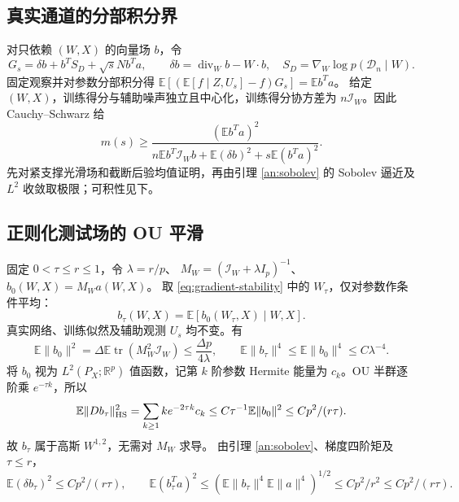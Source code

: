 \documentclass[a4paper]{tufte-handout}
\newcommand{\E}{\mathbb E}
\DeclareMathOperator{\tr}{tr}
\begin{document}
\begin{fullwidth}
\subsection{真实通道的分部积分界}
对只依赖 $(W,X)$ 的向量场 $b$，令
\[
 G_s=\delta b+b^TS_D+\sqrt sN b^Ta,\qquad
 \delta b=\operatorname{div}_Wb-W\cdot b,\quad
 S_D=\nabla_W\log p(\mathcal D_n\mid W).
\]
固定观察并对参数分部积分得
$\E[(\E[f\mid Z,U_s]-f)G_s]=\E b^Ta$。
给定 $(W,X)$，训练得分与辅助噪声独立且中心化，训练得分协方差为
$n\mathcal I_W$。因此 Cauchy--Schwarz 给
\begin{equation}\label{eq:vt-mmse}
 m(s)\ge\frac{(\E b^Ta)^2}
 {n\E b^T\mathcal I_Wb+\E(\delta b)^2+s\E(b^Ta)^2}.
\end{equation}
先对紧支撑光滑场和截断后验均值证明，再由引理 \ref{an:sobolev} 的 Sobolev 逼近及 $L^2$ 收敛取极限；可积性见下。

\subsection{正则化测试场的 OU 平滑}
固定 $0<\tau\le r\le1$，令 $\lambda=r/p$、
$M_W=(\mathcal I_W+\lambda I_p)^{-1}$、$b_0(W,X)=M_Wa(W,X)$。
取 \eqref{eq:gradient-stability} 中的 $W_\tau$，仅对参数作条件平均：
\[
 b_\tau(W,X)=\E[b_0(W_\tau,X)\mid W,X].
\]
真实网络、训练似然及辅助观测 $U_s$ 均不变。有
\[
 \E\|b_0\|^2=\Delta\E\tr(M_W^2\mathcal I_W)
 \le\frac{\Delta p}{4\lambda},\qquad
 \E\|b_\tau\|^4\le\E\|b_0\|^4\le C\lambda^{-4}.
\]
将 $b_0$ 视为 $L^2(P_X;\mathbb R^p)$ 值函数，记第 $k$ 阶参数 Hermite
能量为 $c_k$。OU 半群逐阶乘 $e^{-\tau k}$，所以
\[
 \E\|Db_\tau\|_{\rm HS}^2
 =\sum_{k\ge1}ke^{-2\tau k}c_k
 \le C\tau^{-1}\E\|b_0\|^2\le Cp^2/(r\tau).
\]
故 $b_\tau$ 属于高斯 $W^{1,2}$，无需对 $M_W$ 求导。
由引理 \ref{an:sobolev}、梯度四阶矩及 $\tau\le r$，
\begin{equation}\label{unified:field-cost}
 \E(\delta b_\tau)^2\le Cp^2/(r\tau),\qquad
 \E(b_\tau^Ta)^2\le
 (\E\|b_\tau\|^4\E\|a\|^4)^{1/2}
 \le Cp^2/r^2\le Cp^2/(r\tau).
\end{equation}


\end{fullwidth}
\end{document}
